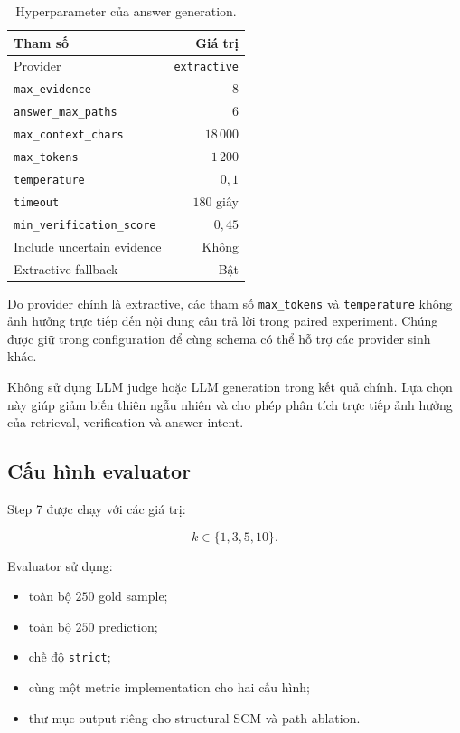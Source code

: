 \begin{table}[t]
    \centering
    \caption{Hyperparameter của answer generation.}
    \label{tab:generation-hyperparameters}
    \begin{tabular}{lr}
        \hline
        \textbf{Tham số} & \textbf{Giá trị} \\
        \hline
        Provider & \texttt{extractive} \\
        \texttt{max\_evidence} & \(8\) \\
        \texttt{answer\_max\_paths} & \(6\) \\
        \texttt{max\_context\_chars} & \(18\,000\) \\
        \texttt{max\_tokens} & \(1\,200\) \\
        \texttt{temperature} & \(0{,}1\) \\
        \texttt{timeout} & \(180\) giây \\
        \texttt{min\_verification\_score} & \(0{,}45\) \\
        Include uncertain evidence & Không \\
        Extractive fallback & Bật \\
        \hline
    \end{tabular}
\end{table}

Do provider chính là extractive, các tham số \texttt{max\_tokens} và
\texttt{temperature} không ảnh hưởng trực tiếp đến nội dung câu trả lời
trong paired experiment. Chúng được giữ trong configuration để cùng schema
có thể hỗ trợ các provider sinh khác.

Không sử dụng LLM judge hoặc LLM generation trong kết quả chính. Lựa chọn
này giúp giảm biến thiên ngẫu nhiên và cho phép phân tích trực tiếp ảnh
hưởng của retrieval, verification và answer intent.

\subsection{Cấu hình evaluator}

Step 7 được chạy với các giá trị:

\[
k \in \{1,3,5,10\}.
\]

Evaluator sử dụng:

\begin{itemize}
    \item toàn bộ \(250\) gold sample;
    \item toàn bộ \(250\) prediction;
    \item chế độ \texttt{strict};
    \item cùng một metric implementation cho hai cấu hình;
    \item thư mục output riêng cho structural SCM và path ablation.
\end{itemize}

